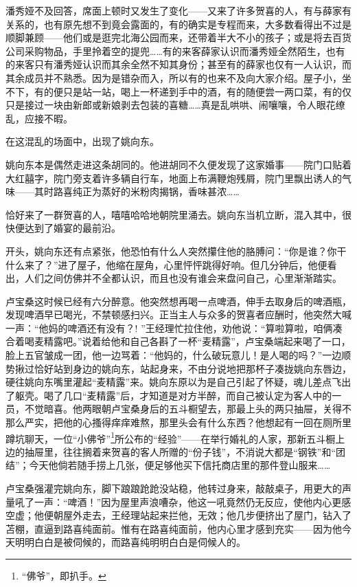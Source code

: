 \par 潘秀娅不及回答，席面上顿时又发生了变化——又来了许多贺喜的人，有与薛家有关系的，也有原先想不到竟会露面的，有的确实是专程而来，大多数看得出不过是顺脚兼顾——他们或是逛完北海公园而来，还带着半大不小的孩子；或是将去百货公司采购物品，手里拎着空的提兜……有的来客薛家认识而潘秀娅全然陌生，也有的来客只有潘秀娅认识而其余全然不知其身份；甚至有的薛家也仅有一人认识，而其余成员并不熟悉。因为是错杂而入，所以有的也来不及向大家介绍。屋子小，坐不下，有的便只是站一站，喝上一杯递到手中的酒，有的随便尝一两口菜，有的仅只是接过一块由新郎或新娘剥去包装的喜糖……真是乱哄哄、闹嚷嚷，令人眼花缭乱，应接不暇。
\par 在这混乱的场面中，出现了姚向东。
\par 姚向东本是偶然走进这条胡同的。他进胡同不久便发现了这家婚事——院门口贴着大红囍字，院门旁支着许多辆自行车，地面上布满鞭炮残屑，院门里飘出诱人的气味——其时路喜纯正为蒸好的米粉肉揭锅，香味甚浓……
\par 恰好来了一群贺喜的人，嘻嘻哈哈地朝院里涌去。姚向东当机立断，混入其中，很快便达到了婚宴的最前沿。
\par 开头，姚向东还有点紧张，他恐怕有什么人突然攥住他的胳膊问：“你是谁？你干什么来了？”进了屋子，他缩在屋角，心里怦怦跳得好响。但几分钟后，他便看出，人们之间仿佛并不全都认识，而且也没有谁会来盘问自己，心里渐渐踏实。
\par 卢宝桑这时候已经有六分醉意。他突然想再喝一点啤酒，伸手去取身后的啤酒瓶，发现啤酒早已喝光，不禁顿感扫兴。正当主人与众多的贺喜者应酬时，他突然大喊一声：“他妈的啤酒还有没有？! ”王经理忙拉住他，劝他说：“算啦算啦，咱俩凑合着喝麦精露吧。”说着给他和自己各斟了一杯“麦精露”，卢宝桑端起来喝了一口，脸上五官皱成一团，他一边骂着：“他妈的，什么破玩意儿！是人喝的吗？”一边顺势揪过恰好站到身边的姚向东，站起身来，不由分说地把那杯子凑拢姚向东唇边，硬往姚向东嘴里灌起“麦精露”来。姚向东原以为是自己引起了怀疑，魂儿差点飞出了躯壳。喝了几口“麦精露”后，才知道是对方半醉，而自己被认定为客人中的一员，不觉暗喜。他两眼朝卢宝桑身后的五斗橱望去，那最上头的两只抽屉，关得不那么严实，把他的心搔得痒痒难熬，那里头会有什么东西？他想起有一回在厕所里蹲坑聊天，一位“小佛爷”\footnote{“佛爷”，即扒手。}所公布的“经验”——在举行婚礼的人家，那新五斗橱上边的抽屉里，往往搁着来贺喜的客人所赠的“份子钱”，不消说大都是“钢铁”和“团结”；今天他倘若随手捞上几张，便足够他买下信托商店里的那件登山服来……
\par 卢宝桑强灌完姚向东，脚下踉踉跄跄没站稳，他转过身来，敲敲桌子，用更大的声量吼了一声：“啤酒！”因为屋里声浪嘈杂，他这一吼竟然仍无反应，使他内心更感空虚；他便朝屋外走去，王经理站起来拦他，无效；他几步便挤出了屋门，钻入了苫棚，直逼到路喜纯面前。惟有在路喜纯面前，他内心里才感到充实——因为他今天明明白白是被伺候的，而路喜纯明明白白是伺候人的。

